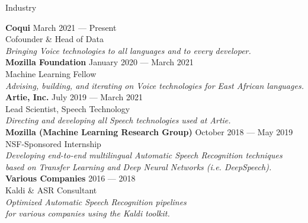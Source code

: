 \documentclass{resume} %
\begin{document}
\begin{rSection}{Industry}

{\bf Coqui} \hfill {March 2021 --- Present} \\
Cofounder \& Head of Data \hfill {} \\
\textit{Bringing Voice technologies to all languages and to every developer.} \hfill {} \\

{\bf Mozilla Foundation} \hfill {January 2020 --- March 2021} \\
Machine Learning Fellow \hfill {} \\
\textit{Advising, building, and iterating on Voice technologies for East African languages.} \hfill {} \\

{\bf Artie, Inc.} \hfill {July 2019 --- March 2021} \\
Lead Scientist, Speech Technology \hfill {} \\
\textit{Directing and developing all Speech technologies used at Artie.} \hfill {} \\

{\bf Mozilla (Machine Learning Research Group)} \hfill {October 2018 --- May 2019} \\
NSF-Sponsored Internship \hfill {} \\
\textit{Developing end-to-end multilingual Automatic Speech Recognition techniques} \hfill {} \\
\textit{based on Transfer Learning and Deep Neural Networks (i.e. DeepSpeech).} \hfill {} \\

{\bf Various Companies} \hfill {2016 --- 2018} \\
Kaldi \& ASR Consultant \hfill {} \\
\textit{Optimized Automatic Speech Recognition pipelines} \hfill {} \\
\textit{for various companies using the Kaldi toolkit.} \hfill {} \\

\end{rSection}
\end{document}
